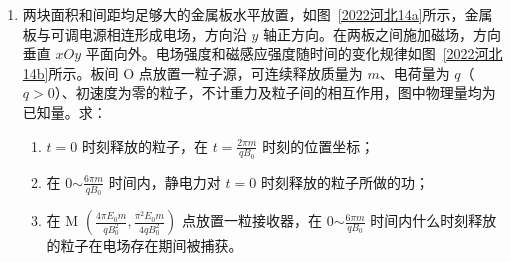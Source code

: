 \documentclass[\gkver]{gaokaozhenti}
\begin{document}
\begin{enumerate}
{$mv_{0}-m\cdot kv_{0}=(m+m)v_{\text{物}}$

解得 $v_{\text{物}}=\frac{1-k}{2}v_{0}=5(1-k)\Ums>0$

可知碰撞后滑块 C、D 形成的新滑块的速度大小为 $5(1-k)\Ums$，方向向右。

滑板 A、B 碰撞过程中满足动量守恒，设碰撞后滑板 A、B 形成的新滑板的速度为 $v_{\text{滑}}$，滑板 A 和 B 质量分别为 $1\Ukg$ 和 $2\Ukg$，则由

$Mv_{0}-2M\cdot kv_{0}=(M+2M)v_{\text{滑}}$

解得

$v_{\text{滑}}=\frac{1-2k}{3}v_{0}=\frac{10-20k}{3}\Ums>0$

则新滑板速度方向也向右。

（2）若 $k=0.5$，可知碰后瞬间物块 C、D 形成的新物块的速度为

$v_{\text{物}}'=5(1-k)\Ums=5(1-0.5)\Ums=2.5\Ums$

碰后瞬间滑板 A、B 形成的新滑板的速度为

$v_{\text{滑}}'=\frac{10-20k}{3}\Ums=0$

可知碰后新物块相对于新滑板向右运动，新物块向右做匀减速运动，新滑板向右做匀加速运动，设新物块的质量为 $m'=2\Ukg$，新滑板的质量为 $M'=3\Ukg$，相对静止时的共同速度为 $v_{\text{共}}$，根据动量守恒可得

$m'v_{\text{物}}'=(m'+M')v_{\text{共}}$

解得 $v_{\text{共}}=1\Ums$

根据能量守恒可得

$\mu m'gx_{\text{相}}=\frac{1}{2}m'v_{\text{物}}'^{2}-\frac{1}{2}(m'+M')v_{\text{共}}^{2}$

解得 $x_{\text{相}}=1.875\Um$
}

\item
两块面积和间距均足够大的金属板水平放置，如图~\ref{2022河北14a}所示，金属板与可调电源相连形成电场，方向沿 $y$ 轴正方向。在两板之间施加磁场，方向垂直 $xOy$ 平面向外。电场强度和磁感应强度随时间的变化规律如图~\ref{2022河北14b}所示。板间 O 点放置一粒子源，可连续释放质量为 $m$、电荷量为 $q$（$q>0$）、初速度为零的粒子，不计重力及粒子间的相互作用，图中物理量均为已知量。求：
\begin{enumerate}
	\item
	$t=0$ 时刻释放的粒子，在 $t=\frac{2\pi m}{qB_{0}}$ 时刻的位置坐标；
	\item
	在 0$\sim\frac{6\pi m}{qB_{0}}$ 时间内，静电力对 $t=0$ 时刻释放的粒子所做的功；
	\item
	在 M $\left( \frac{4\pi E_{0}m}{qB_{0}^{2}},\frac{\pi^{2}E_{0}m}{4qB_{0}^{2}} \right)$ 点放置一粒接收器，在 0$\sim\frac{6\pi m}{qB_{0}}$ 时间内什么时刻释放的粒子在电场存在期间被捕获。
\end{enumerate}


\end{enumerate}
\end{document}
